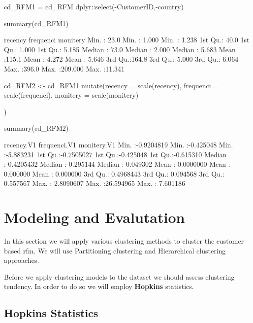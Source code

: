 \begin{Schunk}
\begin{Sinput}
cd_RFM1 = cd_RFM%>% 
dplyr::select(-CustomerID,-country)

summary(cd_RFM1)
\end{Sinput}
\begin{Soutput}
    recency        frequenci          monitery     
 Min.   : 23.0   Min.   :  1.000   Min.   : 1.238  
 1st Qu.: 40.0   1st Qu.:  1.000   1st Qu.: 5.185  
 Median : 73.0   Median :  2.000   Median : 5.683  
 Mean   :115.1   Mean   :  4.272   Mean   : 5.646  
 3rd Qu.:164.8   3rd Qu.:  5.000   3rd Qu.: 6.064  
 Max.   :396.0   Max.   :209.000   Max.   :11.341  
\end{Soutput}
\end{Schunk}

\begin{Schunk}
\begin{Sinput}
cd_RFM2 <- cd_RFM1 %>% 
mutate(recency = scale(recency),
       frequenci = scale(frequenci),
       monitery = scale(monitery)
  
)

summary(cd_RFM2)
\end{Sinput}
\begin{Soutput}
      recency.V1         frequenci.V1         monitery.V1    
 Min.   :-0.9204819   Min.   :-0.425048   Min.   :-5.883231  
 1st Qu.:-0.7505027   1st Qu.:-0.425048   1st Qu.:-0.615310  
 Median :-0.4205432   Median :-0.295144   Median : 0.049302  
 Mean   : 0.0000000   Mean   : 0.000000   Mean   : 0.000000  
 3rd Qu.: 0.4968443   3rd Qu.: 0.094568   3rd Qu.: 0.557567  
 Max.   : 2.8090607   Max.   :26.594965   Max.   : 7.601186  
\end{Soutput}
\end{Schunk}

\hypertarget{modeling-and-evalutation}{%
\section{Modeling and Evalutation}\label{modeling-and-evalutation}}

In this section we will apply various clustering methods to cluster the
customer based rfm. We will use Partitioning clustering and Hierarchical
clustering approaches.

Before we apply clustering models to the dataset we should assess
clustering tendency. In order to do so we will employ \textbf{Hopkins}
statistics.

\hypertarget{hopkins-statistics}{%
\subsection{Hopkins Statistics}\label{hopkins-statistics}}

